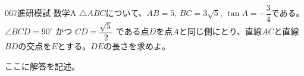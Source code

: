 \begin{thm}{067}{}{進研模試 数学A}
 $\triangle{ABC}$について、$AB=5$, $BC=3\sqrt{5}$, $\tan A=-\dfrac{3}{4}$である。$\angle{BCD}=90^\circ$ かつ $CD=\dfrac{\sqrt{5}}{2}$ である点$D$を点$A$と同じ側にとり、直線$AC$と直線$BD$の交点を$E$とする。$DE$の長さを求めよ。
\end{thm}

ここに解答を記述。